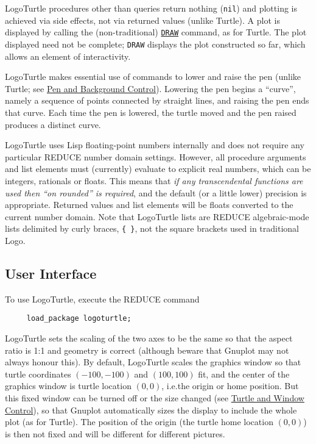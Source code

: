 LogoTurtle procedures other than queries return nothing (\texttt{nil})
and plotting is achieved via side effects, not via returned values
(unlike Turtle).  A plot is displayed by calling the (non-traditional)
\hyperref[logoturtle:draw]{\texttt{DRAW}} command, as for Turtle.
The plot displayed need not be complete; \texttt{DRAW} displays the
plot constructed so far, which allows an element of interactivity.

LogoTurtle makes essential use of commands to lower and raise the pen
(unlike Turtle; see \hyperref[logoturtle:PBC]{Pen and Background
  Control}).  Lowering the pen begins a ``curve'', namely a sequence
of points connected by straight lines, and raising the pen ends that
curve.  Each time the pen is lowered, the turtle moved and the pen
raised produces a distinct curve.

LogoTurtle uses Lisp floating-point numbers internally and does not
require any particular REDUCE number domain settings.  However, all
procedure arguments and list elements must (currently) evaluate to
explicit real numbers, which can be integers, rationals or floats.
This means that \emph{if any transcendental functions are used then
``on rounded'' is required}, and the default (or a little lower)
precision is appropriate.  Returned values and list elements will be
floats converted to the current number domain.  Note that LogoTurtle
lists are REDUCE algebraic-mode lists delimited by curly braces,
\texttt{\{~\}}, not the square brackets used in traditional Logo.

\subsection{User Interface}

To use LogoTurtle, execute the REDUCE command
\begin{verbatim}
     load_package logoturtle;
\end{verbatim}

LogoTurtle sets the scaling of the two axes to be the same so that the
aspect ratio is 1:1 and geometry is correct (although beware that
Gnuplot may not always honour this).  By default, LogoTurtle scales
the graphics window so that turtle coordinates $(-100,-100)$ and
$(100,100)$ fit, and the center of the graphics window is turtle
location $(0,0)$, i.e.\@ the origin or home position.  But this fixed
window can be turned off or the size changed (see
\hyperref[logoturtle:TWC]{Turtle and Window Control}), so that Gnuplot
automatically sizes the display to include the whole plot (as for
Turtle).  The position of the origin (the turtle home location
$(0,0)$) is then not fixed and will be different for different
pictures.

